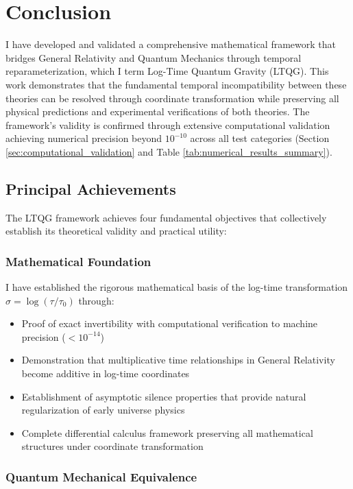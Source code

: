 \section{Conclusion}
\label{sec:conclusion}

I have developed and validated a comprehensive mathematical framework that bridges General Relativity and Quantum Mechanics through temporal reparameterization, which I term Log-Time Quantum Gravity (LTQG). This work demonstrates that the fundamental temporal incompatibility between these theories can be resolved through coordinate transformation while preserving all physical predictions and experimental verifications of both theories. The framework's validity is confirmed through extensive computational validation achieving numerical precision beyond $10^{-10}$ across all test categories (Section \ref{sec:computational_validation} and Table \ref{tab:numerical_results_summary}).

\subsection{Principal Achievements}
\label{subsec:principal_achievements}

The LTQG framework achieves four fundamental objectives that collectively establish its theoretical validity and practical utility:

\subsubsection{Mathematical Foundation}

I have established the rigorous mathematical basis of the log-time transformation $\sigma = \log(\tau/\tau_0)$ through:
\begin{itemize}
\item Proof of exact invertibility with computational verification to machine precision ($< 10^{-14}$)
\item Demonstration that multiplicative time relationships in General Relativity become additive in log-time coordinates
\item Establishment of asymptotic silence properties that provide natural regularization of early universe physics
\item Complete differential calculus framework preserving all mathematical structures under coordinate transformation
\end{itemize}

\subsubsection{Quantum Mechanical Equivalence}

